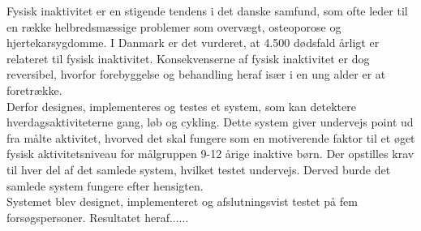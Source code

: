 Fysisk inaktivitet er en stigende tendens i det danske samfund, som ofte leder til en række helbredsmæssige problemer som overvægt, osteoporose og hjertekarsygdomme. I Danmark er det vurderet, at 4.500 dødsfald årligt er relateret til fysisk inaktivitet. Konsekvenserne af fysisk inaktivitet er dog reversibel, hvorfor forebyggelse og behandling heraf især i en ung alder er at foretrække.\\
Derfor designes, implementeres og testes et system, som kan detektere hverdagsaktiviteterne gang, løb og cykling. Dette system giver undervejs point ud fra målte aktivitet, hvorved det skal fungere som en motiverende faktor til et øget fysisk aktivitetsniveau for målgruppen 9-12 årige inaktive børn. Der opstilles krav til hver del af det samlede system, hvilket testet undervejs. Derved burde det samlede system fungere efter hensigten.\\
Systemet blev designet, implementeret og afslutningsvist testet på fem forsøgspersoner. Resultatet heraf......